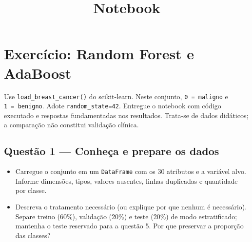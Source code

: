\documentclass[11pt]{article}
\title{Notebook}
\providecommand{\tightlist}{%
      \setlength{\itemsep}{0pt}\setlength{\parskip}{0pt}}
\begin{document}
    
    \maketitle
    
    

    
    \section{Exercício: Random Forest e
AdaBoost}\label{exercuxedcio-random-forest-e-adaboost}

Use \texttt{load\_breast\_cancer()} do scikit-learn. Neste conjunto,
\texttt{0\ =\ maligno} e \texttt{1\ =\ benigno}. Adote
\texttt{random\_state=42}. Entregue o notebook com código executado e
respostas fundamentadas nos resultados. Trata-se de dados didáticos; a
comparação não constitui validação clínica.

    \subsection{Questão 1 --- Conheça e prepare os
dados}\label{questuxe3o-1-conheuxe7a-e-prepare-os-dados}

\begin{itemize}
\tightlist
\item
  Carregue o conjunto em um \texttt{DataFrame} com os 30 atributos e a
  variável alvo. Informe dimensões, tipos, valores ausentes, linhas
  duplicadas e quantidade por classe.
\item
  Descreva o tratamento necessário (ou explique por que nenhum é
  necessário). Separe treino (60\%), validação (20\%) e teste (20\%) de
  modo estratificado; mantenha o teste reservado para a questão 5. Por
  que preservar a proporção das classes?
\end{itemize}
\end{document}

